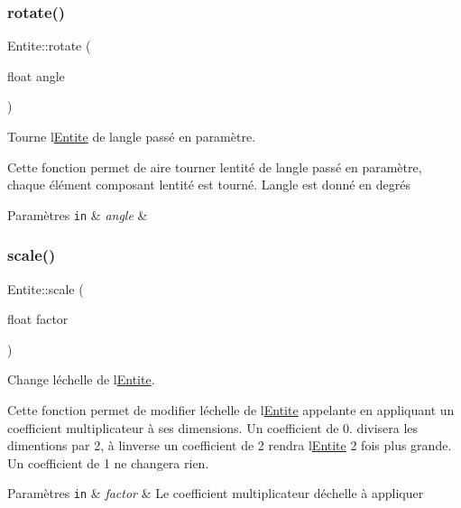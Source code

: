 \subsubsection{\texorpdfstring{rotate()}{rotate()}}
{\footnotesize\ttfamily Entite\+::rotate (\begin{DoxyParamCaption}\item[{float}]{angle }\end{DoxyParamCaption})}



Tourne l\textquotesingle{}\hyperlink{class_entite}{Entite} de l\textquotesingle{}angle passé en paramètre. 

Cette fonction permet de aire tourner l\textquotesingle{}entité de l\textquotesingle{}angle passé en paramètre, chaque élément composant l\textquotesingle{}entité est tourné. L\textquotesingle{}angle est donné en degrés 
\begin{DoxyParams}[1]{Paramètres}
\mbox{\tt in}  & {\em angle} & \\
\hline
\end{DoxyParams}
\mbox{\label{class_entite_a770f6c53856606c4de768bb942299659}} 
\subsubsection{\texorpdfstring{scale()}{scale()}}
{\footnotesize\ttfamily Entite\+::scale (\begin{DoxyParamCaption}\item[{float}]{factor }\end{DoxyParamCaption})}



Change l\textquotesingle{}échelle de l\textquotesingle{}\hyperlink{class_entite}{Entite}. 

Cette fonction permet de modifier l\textquotesingle{}échelle de l\textquotesingle{}\hyperlink{class_entite}{Entite} appelante en appliquant un coefficient multiplicateur à ses dimensions. Un coefficient de 0. divisera les dimentions par 2, à l\textquotesingle{}inverse un coefficient de 2 rendra l\textquotesingle{}\hyperlink{class_entite}{Entite} 2 fois plus grande. Un coefficient de 1 ne changera rien. 
\begin{DoxyParams}[1]{Paramètres}
\mbox{\tt in}  & {\em factor} & Le coefficient multiplicateur d\textquotesingle{}échelle à appliquer \\
\hline
\end{DoxyParams}
\mbox{\label{class_entite_a4b0ce40a2427f44978728dbae9560fee}} 

